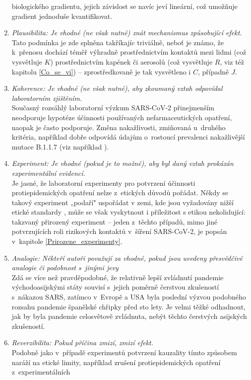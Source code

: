 \begin{enumerate}
biologického gradientu, jejich závislost se navíc jeví lineární, což umožňuje gradient jednoduše kvantifikovat.
\item \emph{Plausibilita: Je vhodné (ne však nutné) znát mechanismus způsobující
efekt.} \\
Tato podmínka je zde splněna takříkajíc triviálně, neboť je známo,
že k~přenosu dochází téměř výhradně prostřednictvím kontaktů mezi lidmi
(což vysvětluje $K$) prostřednictvím kapének či aerosolů (což vysvětluje
$R$, viz též kapitolu \ref{Co_se_vi}) -- zprostředkovaně je tak vysvětleno i $C$, případně $J$.
\item \emph{Koherence: Je vhodné (ne však nutné), aby zkoumaný vztah odpovídal
laboratorním zjištěním.}\\
Současný rozsáhlý laboratorní výzkum SARS-CoV-2 přinejmenším neodporuje
hypotéze účinnosti používaných nefarmaceutických opatření, naopak
je často podporuje. Změna nakažlivosti, zmiňovaná u~druhého kritéria, například dobře odpovídá údajům o~rostoucí prevalenci nakažlivější mutace B.1.1.7 (viz například \cite{diana}).
\item \emph{Experiment: Je vhodné (pokud je to možné), aby byl daný vztah
prokázán experimentální evidencí.}\\
Je jasné, že laboratorní experimenty pro potvrzení účinnosti protiepidemických
opatření nelze z~etických důvodů pořádat. Někdy se takový experiment „podaří" uspořádat v zemi, kde jsou vyžadovány nižší etické standardy \cite{abaluck2021impact}, může se však vyskytnout i příležitost s etikou nekolidující:
takzvaný přirozený experiment -- jeden z~těchto případů, mimo jiné potvrzujících
roli rizikových kontaktů v~šíření SARS-CoV-2, je popsán v~kapitole
\ref{Prirozene_experimenty}.
\item \emph{Analogie: Někteří autoři považují za vhodné, pokud jsou 
uvedeny přesvědčivé analogie či podobnost s~jinými jevy}\\
Zdá se více než pravděpodobné, že relativně lepší zvládnutí pandemie
východoasijskými státy souvisí s~jejich poměrně čerstvou zkušeností
s~nákazou SARS, zatímco v~Evropě a USA byla poslední 
výzvou podobného rozsahu pandemie španělské chřipky před sto lety. Je velmi těžké odhadnout,
jak by byla pandemie celosvětově zvládnuta, nebýt těchto čerstvých
asijských zkušeností.
\item \emph{Reverzibilita: Pokud příčina zmizí, zmizí efekt.}\\
Podobně jako v~případě experimentů potvrzení kauzality tímto způsobem
naráží na etické limity, například zrušení protiepidemických opatření z~experimentálních

\end{enumerate}
